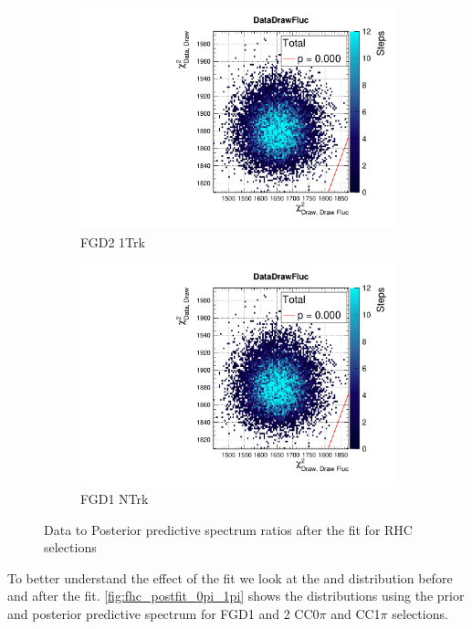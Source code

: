 \begin{figure}[h]
\begin{subfigure}[t]{0.24\textwidth}
	\includegraphics[width=\textwidth, trim={20mm 6mm 4mm 11mm}, clip,page=113]{figures/mach3/data/postpred/2017b_NewData_NewDet_UpdXsecStep_2Xsec_4Det_5Flux_0_PostPred_procs}
	\caption{FGD2 \numu 1Trk}
\end{subfigure}
\begin{subfigure}[t]{0.24\textwidth}
	\includegraphics[width=\textwidth, trim={20mm 6mm 4mm 11mm}, clip,page=122]{figures/mach3/data/postpred/2017b_NewData_NewDet_UpdXsecStep_2Xsec_4Det_5Flux_0_PostPred_procs}
	\caption{FGD1 \numu NTrk}
\end{subfigure}
\caption{Data to Posterior predictive \pmu \cosmu spectrum ratios after the fit for RHC selections}
\label{fig:posterior_pred_data_rhc}
\end{figure}

To better understand the effect of the fit we look at the \pmu and \cosmu distribution before and after the fit. \autoref{fig:fhc_postfit_0pi_1pi} shows the distributions using the prior and posterior predictive spectrum for FGD1 and 2 CC0$\pi$ and CC1$\pi$ selections. 

